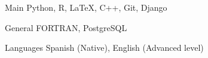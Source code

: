 

\begin{cvskills}


  \cvskill
    {Main} %
    {Python, R, \LaTeX, C++, Git,  Django}
  
 \cvskill
    {General} %
    {FORTRAN, PostgreSQL} %

  \cvskill
    {Languages} %
    {Spanish (Native), English (Advanced level)} %

\end{cvskills}
